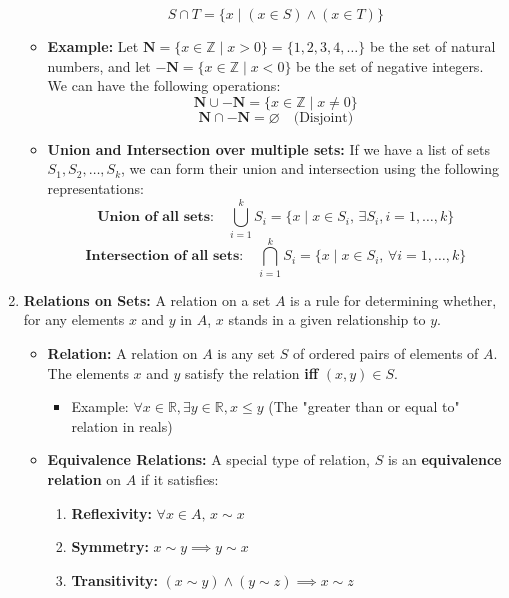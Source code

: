\begin{enumerate}
\begin{itemize}
                \[S \cap T = \{x \mid (x \in S) \land (x \in T)\}\]
            \item \textbf{Example:} Let \(\mathbf{N} = \{x \in \mathbb{Z} \mid x > 0\} = \{1, 2, 3, 4, \dots\}\) be the set of natural numbers, and let \(-\mathbf{N} = \{x \in \mathbb{Z} \mid x < 0\}\) be the set of negative integers. We can have the following operations:
                \[\mathbf{N} \cup -\mathbf{N} = \{x \in \mathbb{Z} \mid x \neq 0\}\]
                \[\mathbf{N} \cap -\mathbf{N} = \varnothing \quad \text{(Disjoint)}\] 
            \item \textbf{Union and Intersection over multiple sets:} If we have a list of sets \(S_1, S_2, \dots, S_k\), we can form their union and intersection using the following representations:
                \[\textbf{Union of all sets:}\quad\bigcup_{i=1}^{k} S_i = \{x \mid x \in S_i, \, \exists S_i, i = 1, \dots, k\}\]
                \[\textbf{Intersection of all sets:}\quad\bigcap_{i=1}^{k} S_i = \{x \mid x \in S_i, \, \forall i = 1, \dots, k\}\]
        \end{itemize}
\newpage
    \item \textbf{Relations on Sets:} A relation on a set \(A\) is a rule for determining whether, for any elements \(x\) and \(y\) in \(A\), \(x\) stands in a given relationship to \(y\).
        \begin{itemize}
            \item \textbf{Relation:} A relation on \(A\) is any set \(S\) of ordered pairs of elements of \(A\). The elements \(x\) and \(y\) satisfy the relation \textbf{iff} \((x, y) \in S\).
                \begin{itemize}
                    \item Example: \quad \(\forall x \in \mathbb{R}, \exists y \in \mathbb{R}, x \leq y\) \quad (The "greater than or equal to" relation in reals)
                \end{itemize}
            \item \textbf{Equivalence Relations:} A special type of relation, \(S\) is an \textbf{equivalence relation} on \(A\) if it satisfies:
                \begin{enumerate}
                    \item \textbf{Reflexivity:} \(\forall x \in A, \, x \sim x\)
                    \item \textbf{Symmetry:} \(x \sim y \implies y \sim x\)
                    \item \textbf{Transitivity:} \((x \sim y) \land (y \sim z) \implies x \sim z\)
                \end{enumerate}
                

\end{itemize}
\end{enumerate}
